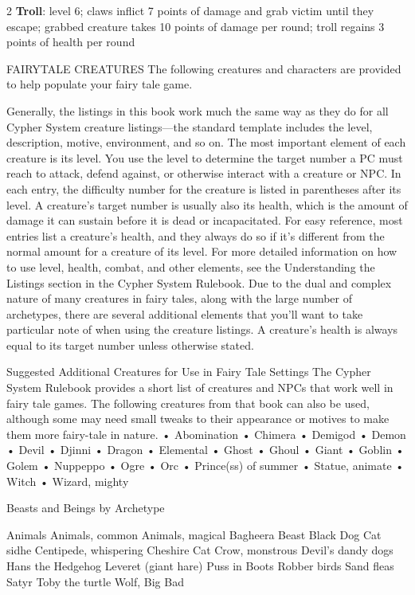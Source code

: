 \begin{multicols}{2}
\textbf{Troll}: level 6; claws inflict 7 points of damage and grab victim until they escape; grabbed creature takes 10 points of damage per round; troll regains 3 points of health per round


FAIRYTALE CREATURES
The following creatures and characters are provided to help populate your fairy tale game. 

Generally, the listings in this book work much the same way as they do for all Cypher System creature listings—the standard template includes the level, description, motive, environment, and so on.
The most important element of each creature is its level. You use the level to determine the target number a PC must reach to attack, defend against, or otherwise interact with a creature or NPC. In each entry, the difficulty number for the creature is listed in parentheses after its level.
A creature’s target number is usually also its health, which is the amount of damage it can sustain before it is dead or incapacitated. For easy reference, most entries list a creature’s health, and they always do so if it’s different from the normal amount for a creature of its level.
For more detailed information on how to use level, health, combat, and other elements, see the Understanding the Listings section in the Cypher System Rulebook.
Due to the dual and complex nature of many creatures in fairy tales, along with the large number of archetypes, there are several additional elements that you’ll want to take particular note of when using the creature listings.
	A creature’s health is always equal to its target number unless otherwise stated.

Suggested Additional Creatures for Use in Fairy Tale Settings
The Cypher System Rulebook provides a short list of creatures and NPCs that work well in fairy tale games. The following creatures from that book can also be used, although some may need small tweaks to their appearance or motives to make them more fairy-tale in nature.
• Abomination • Chimera
• Demigod
• Demon
• Devil
• Djinni
• Dragon
• Elemental
• Ghost
• Ghoul
• Giant
• Goblin
• Golem
• Nuppeppo
• Ogre
• Orc
• Prince(ss) of summer • Statue, animate
• Witch
• Wizard, mighty

Beasts and Beings by Archetype 

Animals
Animals, common
Animals, magical
Bagheera
Beast
Black Dog
Cat sidhe
Centipede, whispering
Cheshire Cat
Crow, monstrous
Devil’s dandy dogs
Hans the Hedgehog
Leveret (giant hare)
Puss in Boots
Robber birds
Sand fleas
Satyr
Toby the turtle
Wolf, Big Bad


\end{multicols}
